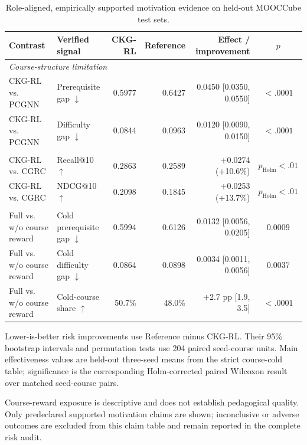 \begin{table}[t]
\centering
\begin{threeparttable}
\caption{Role-aligned, empirically supported motivation evidence on held-out MOOCCube test sets.}
\label{tab:p1-motivation-evidence}
\footnotesize
\setlength{\tabcolsep}{4.5pt}
\begin{tabular*}{\textwidth}{@{\extracolsep{\fill}}llrrrc}
\toprule
Contrast & Verified signal & CKG-RL & Reference & Effect / improvement & $p$ \\
\midrule
\multicolumn{6}{l}{\textit{Course-structure limitation}} \\
CKG-RL vs. PCGNN & Prerequisite gap $\downarrow$ & 0.5977 & 0.6427 & 0.0450 [0.0350, 0.0550] & $<.0001$ \\
CKG-RL vs. PCGNN & Difficulty gap $\downarrow$ & 0.0844 & 0.0963 & 0.0120 [0.0090, 0.0150] & $<.0001$ \\
\addlinespace[1pt]
\multicolumn{6}{l}{\textit{Strict cold-start effectiveness}} \\
CKG-RL vs. CGRC & Recall@10 $\uparrow$ & 0.2863 & 0.2589 & +0.0274 (+10.6\%) & $p_{\mathrm{Holm}}<.01$ \\
CKG-RL vs. CGRC & NDCG@10 $\uparrow$ & 0.2098 & 0.1845 & +0.0253 (+13.7\%) & $p_{\mathrm{Holm}}<.01$ \\
\addlinespace[1pt]
\multicolumn{6}{l}{\textit{Course-reward mechanism}} \\
Full vs. w/o course reward & Cold prerequisite gap $\downarrow$ & 0.5994 & 0.6126 & 0.0132 [0.0056, 0.0205] & $0.0009$ \\
Full vs. w/o course reward & Cold difficulty gap $\downarrow$ & 0.0864 & 0.0898 & 0.0034 [0.0011, 0.0056] & $0.0037$ \\
Full vs. w/o course reward & Cold-course share $\uparrow$ & 50.7\% & 48.0\% & +2.7 pp [1.9, 3.5] & $<.0001$ \\
\bottomrule
\end{tabular*}
\begin{tablenotes}[flushleft]
\scriptsize
\item Lower-is-better risk improvements use Reference minus CKG-RL. Their 95\% bootstrap intervals and permutation tests use 204 paired seed-course units. Main effectiveness values are held-out three-seed means from the strict course-cold table; significance is the corresponding Holm-corrected paired Wilcoxon result over matched seed-course pairs.
\item Course-reward exposure is descriptive and does not establish pedagogical quality. Only predeclared supported motivation claims are shown; inconclusive or adverse outcomes are excluded from this claim table and remain reported in the complete risk audit.
\end{tablenotes}
\end{threeparttable}
\end{table}
